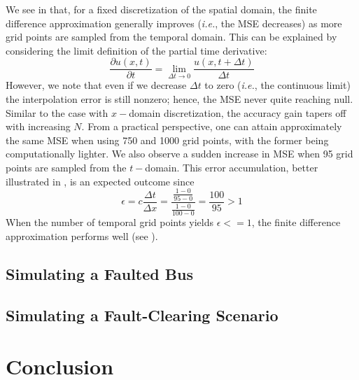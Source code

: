 \documentclass{article}
\begin{document}
We see in  that,
for a fixed discretization of the spatial domain,
the finite difference approximation generally improves
(\textit{i.e.}, the MSE decreases)
as more grid points are sampled from the temporal domain.
This can be explained by considering the limit definition of the partial time derivative:
\begin{equation}
	\label{eqn: Limit definition of the partial derivative wrt to t}
	\frac{\partial u \left(x,t\right)}{\partial t}
	=
	\lim_{\Delta t \longrightarrow 0}
	\frac{u \left(x, t + \Delta t\right)}{\Delta t}
\end{equation}
However, we note that even if we decrease $\Delta t$ to zero
(\textit{i.e.}, the continuous limit)
the interpolation error is still nonzero;
hence, the MSE never quite reaching null.
Similar to the case with $x-$domain discretization,
the accuracy gain tapers off with increasing $N$.
From a practical perspective, one can attain approximately the same MSE when using 750 and 1000 grid points,
with the former being computationally lighter.
We also observe a sudden increase in MSE when 95 grid points are sampled from the $t-$domain.
This error accumulation,
better illustrated in ,
is an expected outcome since
\begin{equation*}
	\epsilon = c \frac{\Delta t}{\Delta x}
	= \frac{\frac{1 - 0}{95 - 0}}{\frac{1 - 0}{100-0}}
	= \frac{100}{95}
	> 1
\end{equation*}
When the number of temporal grid points yields $\epsilon <= 1$,
the finite difference approximation performs well (see ).

\subsection{Simulating a Faulted Bus}
\label{subsec: Simulating a Faulted Bus}

\lipsum[84]

\subsection{Simulating a Fault-Clearing Scenario}
\label{subsec: Simulating a Fault-Clearing Scenario}

\lipsum[85]

\section{Conclusion}
\label{sec: Conclusion}
\end{document}
